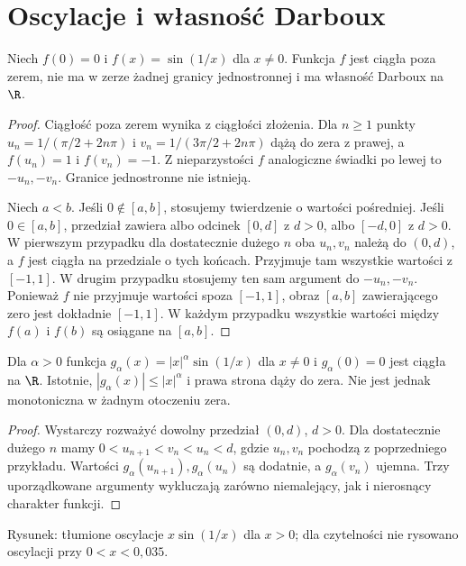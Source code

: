 \section{Oscylacje i własność Darboux}
\begin{przyklad}
\label{ma1:ex:oscillatory-darboux}
Niech $f(0)=0$ i $f(x)=\sin(1/x)$ dla $x\ne0$. Funkcja $f$ jest ciągła poza zerem, nie ma w zerze żadnej granicy jednostronnej i ma własność Darboux na $\R$.
\end{przyklad}
\begin{proof}
Ciągłość poza zerem wynika z ciągłości złożenia. Dla $n\ge1$ punkty $u_n=1/(\pi/2+2n\pi)$ i $v_n=1/(3\pi/2+2n\pi)$ dążą do zera z prawej, a $f(u_n)=1$ i $f(v_n)=-1$. Z nieparzystości $f$ analogiczne świadki po lewej to $-u_n,-v_n$. Granice jednostronne nie istnieją.

Niech $a<b$. Jeśli $0\notin[a,b]$, stosujemy twierdzenie o wartości pośredniej. Jeśli $0\in[a,b]$, przedział zawiera albo odcinek $[0,d]$ z $d>0$, albo $[-d,0]$ z $d>0$. W pierwszym przypadku dla dostatecznie dużego $n$ oba $u_n,v_n$ należą do $(0,d)$, a $f$ jest ciągła na przedziale o tych końcach. Przyjmuje tam wszystkie wartości z $[-1,1]$. W drugim przypadku stosujemy ten sam argument do $-u_n,-v_n$. Ponieważ $f$ nie przyjmuje wartości spoza $[-1,1]$, obraz $[a,b]$ zawierającego zero jest dokładnie $[-1,1]$. W każdym przypadku wszystkie wartości między $f(a)$ i $f(b)$ są osiągane na $[a,b]$.
\end{proof}

\begin{przyklad}
\label{ma1:ex:damped-oscillations}
Dla $\alpha>0$ funkcja $g_\alpha(x)=|x|^\alpha\sin(1/x)$ dla $x\ne0$ i $g_\alpha(0)=0$ jest ciągła na $\R$. Istotnie, $|g_\alpha(x)|\le |x|^\alpha$ i prawa strona dąży do zera. Nie jest jednak monotoniczna w żadnym otoczeniu zera.
\end{przyklad}
\begin{proof}
Wystarczy rozważyć dowolny przedział $(0,d)$, $d>0$. Dla dostatecznie dużego $n$ mamy $0<u_{n+1}<v_n<u_n<d$, gdzie $u_n,v_n$ pochodzą z poprzedniego przykładu. Wartości $g_\alpha(u_{n+1}),g_\alpha(u_n)$ są dodatnie, a $g_\alpha(v_n)$ ujemna. Trzy uporządkowane argumenty wykluczają zarówno niemalejący, jak i nierosnący charakter funkcji.
\end{proof}
\begin{center}

\small Rysunek: tłumione oscylacje $x\sin(1/x)$ dla $x>0$; dla czytelności nie rysowano oscylacji przy $0<x<0{,}035$.
\end{center}

